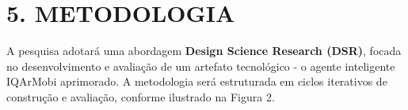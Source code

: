 \documentclass[12pt, a4paper]{article}
\begin{document}

\section*{5. METODOLOGIA}

A pesquisa adotará uma abordagem \textbf{Design Science Research (DSR)}, 
focada no desenvolvimento e avaliação de um artefato tecnológico - o agente inteligente IQArMobi aprimorado. 
A metodologia será estruturada em ciclos iterativos de construção e avaliação, conforme ilustrado na Figura 2.
\end{document}
